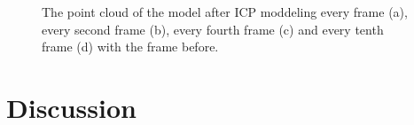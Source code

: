 \documentclass[11pt,a4paper]{article}
\begin{document}
\begin{figure}
\begin{tabular}{cc}
\end{tabular}
\caption{The point cloud of the model after ICP moddeling every frame (a), every second frame (b), every fourth frame (c) and every tenth frame (d) with the frame before.}
\label{fig:}
\end{figure}

\section{Discussion}
\end{document}
